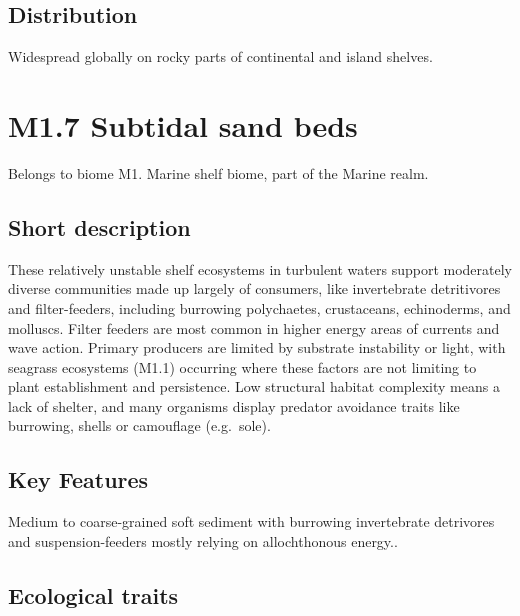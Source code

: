 \documentclass[
  letterpaper,
  DIV=11,
  numbers=noendperiod]{scrartcl}
\begin{document}
\subsection{Distribution}\label{distribution-31}

Widespread globally on rocky parts of continental and island shelves.

\section{M1.7 Subtidal sand beds}\label{m1.7-subtidal-sand-beds}

Belongs to biome M1. Marine shelf biome, part of the Marine realm.

\subsection{Short description}\label{short-description-32}

These relatively unstable shelf ecosystems in turbulent waters support
moderately diverse communities made up largely of consumers, like
invertebrate detritivores and filter-feeders, including burrowing
polychaetes, crustaceans, echinoderms, and molluscs. Filter feeders are
most common in higher energy areas of currents and wave action. Primary
producers are limited by substrate instability or light, with seagrass
ecosystems (M1.1) occurring where these factors are not limiting to
plant establishment and persistence. Low structural habitat complexity
means a lack of shelter, and many organisms display predator avoidance
traits like burrowing, shells or camouflage (e.g.~sole).

\subsection{Key Features}\label{key-features-32}

Medium to coarse-grained soft sediment with burrowing invertebrate
detrivores and suspension-feeders mostly relying on allochthonous
energy..

\subsection{Ecological traits}\label{ecological-traits-32}
\end{document}
